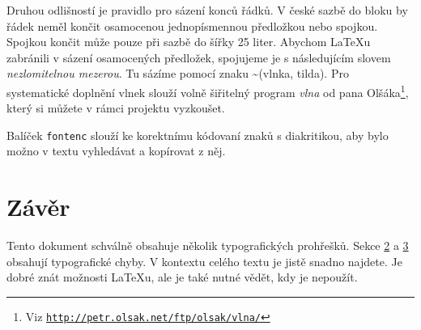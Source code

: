 \documentclass[10pt, a4paper, twocolumn]{article}
\begin{document}
Druhou odlišností je pravidlo pro sázení konců řádků.
V české sazbě do bloku by řádek neměl končit osamocenou jednopísmennou předložkou nebo spojkou.
Spojkou  končit může pouze při sazbě do šířky 25 liter.
Abychom \LaTeX u zabránili v sázení osamocených předložek, spojujeme je s následujícím slovem \emph{nezlomitelnou mezerou}.
Tu sázíme pomocí znaku \textasciitilde (vlnka, tilda).
Pro systematické doplnění vlnek slouží volně šiřitelný program \emph{vlna} od pana Olšáka\footnote{Viz \texttt{\href{http://petr.olsak.net/ftp/olsak/vlna/} {http://petr.olsak.net/ftp/olsak/vlna/}}}, který si můžete v rámci projektu vyzkoušet.

Balíček \texttt{fontenc} slouží ke korektnímu kódovaní znaků s diakritikou, aby bylo možno v textu vyhledávat a kopírovat z něj.


\section{Závěr}

Tento dokument schválně obsahuje několik typografických prohřešků.
Sekce \hyperlink{second}{2} a \hyperlink{third}{3} obsahují typografické chyby.
V kontextu celého textu je jistě snadno najdete.
Je dobré znát možnosti \LaTeX u, ale je také nutné vědět, kdy je nepoužít.
\end{document}
